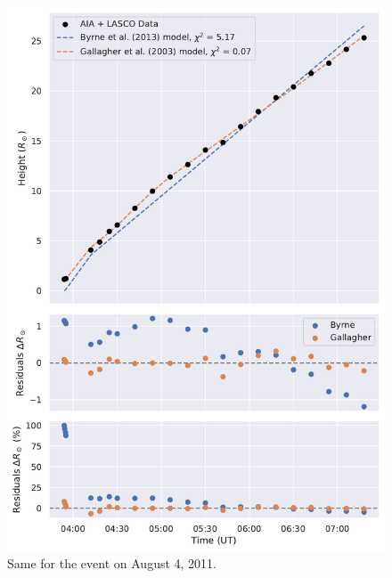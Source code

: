 \begin{figure}[!htp]
	\centering
	\includegraphics[width=0.8\hsize]{chapter2/figs/appendix/height_profile_residuals_aia_lasco_110804_01.pdf}
	\caption{Same for the event on August 4, 2011.}
\end{figure}

